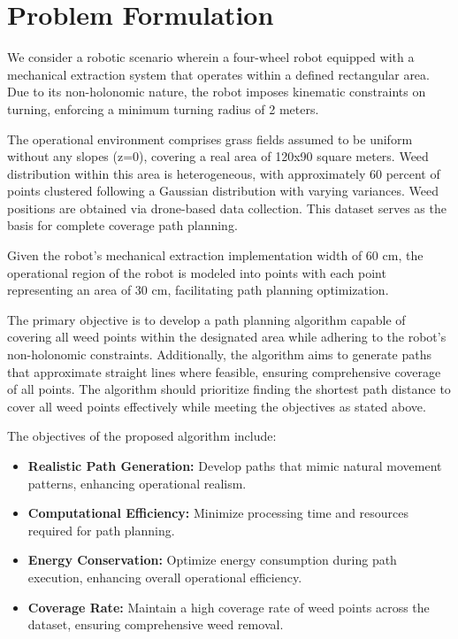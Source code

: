 \chapter{Problem Formulation}

We consider a robotic scenario wherein a four-wheel robot equipped with a mechanical extraction system that operates within a defined rectangular area. Due to its non-holonomic nature, the robot imposes kinematic constraints on turning, enforcing a minimum turning radius of 2 meters.

\vspace{3mm}


The operational environment comprises grass fields assumed to be uniform without any slopes (z=0), covering a real area of 120x90 square meters. Weed distribution within this area is heterogeneous, with approximately 60 percent of points clustered following a Gaussian distribution with varying variances. Weed positions are obtained via drone-based data collection. This dataset serves as the basis for complete coverage path planning.

\vspace{3mm}


Given the robot's mechanical extraction implementation width of 60 cm, the operational region of the robot is modeled into points with each point representing an area of 30 cm, facilitating path planning optimization. 
\vspace{3mm}


The primary objective is to develop a path planning algorithm capable of covering all weed points within the designated area while adhering to the robot's non-holonomic constraints. Additionally, the algorithm aims to generate paths that approximate straight lines where feasible, ensuring comprehensive coverage of all points. The algorithm should prioritize finding the shortest path distance to cover all weed points effectively while meeting the objectives as stated above.

\vspace{3mm}

The objectives of the proposed algorithm include:

\begin{itemize}
    \item \textbf{Realistic Path Generation:} Develop paths that mimic natural movement patterns, enhancing operational realism.
    \item  \textbf{Computational Efficiency:} Minimize processing time and resources required for path planning.
    \item  \textbf{Energy Conservation:} Optimize energy consumption during path execution, enhancing overall operational efficiency.
    \item \textbf{Coverage Rate:} Maintain a high coverage rate of weed points across the dataset, ensuring comprehensive weed removal.   
\end{itemize}

 
